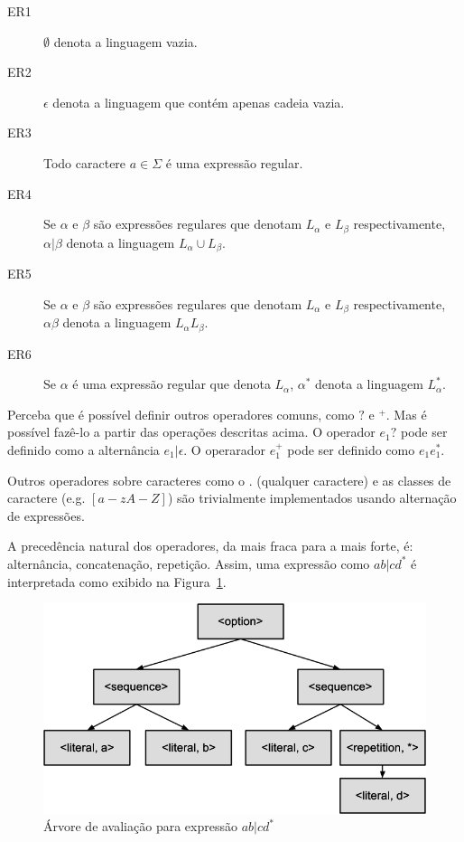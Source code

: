 \documentclass[a4paper,12pt,oneside,onecolumn]{uerj}
\begin{document}
\begin{description}
    \item[ER1] $\emptyset$ denota a linguagem vazia.
    \item[ER2] $\epsilon$ denota a linguagem que contém apenas cadeia vazia.
    \item[ER3] Todo caractere $a \in \Sigma$ é uma expressão regular.
    \item[ER4] Se $\alpha$ e $\beta$ são expressões regulares que denotam $L_\alpha$ e $L_\beta$ respectivamente, $\alpha|\beta$ denota a linguagem $L_\alpha \cup L_\beta$.
    \item[ER5] Se $\alpha$ e $\beta$ são expressões regulares que denotam $L_\alpha$ e $L_\beta$ respectivamente, $\alpha\beta$ denota a linguagem $L_\alpha L_\beta$.
    \item[ER6] Se $\alpha$ é uma expressão regular que denota $L_\alpha$, $\alpha^*$ denota a linguagem $L_\alpha^*$.
\end{description}

Perceba que é possível definir outros operadores comuns, como $?$ e $^+$. Mas é possível fazê-lo a partir das operações descritas acima. O operador $e_1?$ pode ser definido como a alternância $e_1|\epsilon$. O operarador $e_1^+$ pode ser definido como $e_1e_1^*$.

Outros operadores sobre caracteres como o $.$ (qualquer caractere) e as classes de caractere (e.g. $[a-zA-Z]$) são trivialmente implementados usando alternação de expressões.

A precedência natural dos operadores, da mais fraca para a mais forte, é: alternância, concatenação, repetição. Assim, uma expressão como $ab|cd^*$ é interpretada como exibido na Figura~\ref{fig:abcd_parse_tree}.

\begin{figure}[!htbp]
  \centering
  \includegraphics[scale=0.4]{figures/abcd_parse_tree.png}
  \caption{Árvore de avaliação para expressão $ab|cd^*$}
  \label{fig:abcd_parse_tree}
\end{figure}
\end{document}
